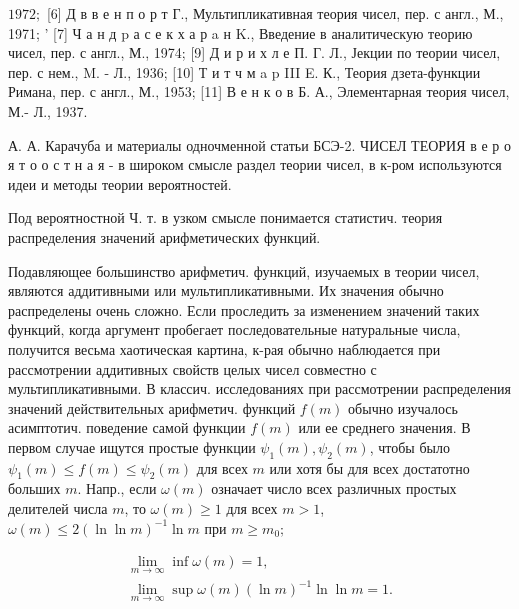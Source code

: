 \documentclass[10pt]{article}
\begin{document}
$1972 ;$ [6] Д в в е н п о р т Г., Мультипликативная теория чисел, пер. с англ., М., 1971; ' [7] Ч а н д p а с е к х а р a н K., Введение в аналитическую теорию чисел, пер. с англ., М., 1974; [9] Д и р и х л е П. Г. Л., Јекции по теории чисел, пер. с нем., M. - Л., 1936; [10] Т и т ч м a p III E. К., Теория дзета-функции Римана, пер. с англ., М., 1953; [11] В е н к о в Б. А., Элементарная теория чисел, М.- Л., 1937.



А. А. Карачуба и материалы одночменной статьи БСЭ-2. ЧИСЕЛ ТЕОРИЯ в е р о я т о о с т н а я - в широком смысле раздел теории чисел, в к-ром используются идеи и методы теории вероятностей.



Под вероятностной Ч. т. в узком смысле понимается статистич. теория распределения значений арифметических функций.



Подавляющее большинство арифметич. функций, изучаемых в теории чисел, являются аддитивными или мультипликативными. Их значения обычно распределены очень сложно. Если проследить за изменением значений таких функций, когда аргумент пробегает последовательные натуральные числа, получится весьма хаотическая картина, к-рая обычно наблюдается при рассмотрении аддитивных свойств целых чисел совместно с мультипликативными. В классич. исследованиях при рассмотрении распределения значений действительных арифметич. функций $f(m)$ обычно изучалось асимптотич. поведение самой функции $f(m)$ или ее среднего значения. В первом случае ищутся простые функции $\psi_{1}(m), \psi_{2}(m)$, чтобы было $\psi_{1}(m) \leqslant f(m) \leqslant \psi_{2}(m)$ для всех $m$ или хотя бы для всех достатотно больших $m$. Напр., если $\omega(m)$ означает число всех различных простых делителей числа $m$, то $\omega(m) \geqslant 1$ для всех $m>1$, $\omega(m) \leqslant 2(\ln \ln m)^{-1} \ln m$ при $m \geqslant m_{0} ;$



\[

\begin{gathered}

\lim _{m \rightarrow \infty} \inf \omega(m)=1, \\

\lim _{m \rightarrow \infty} \sup \omega(m)(\ln m)^{-1} \ln \ln m=1 .

\end{gathered}

\]
\end{document}
